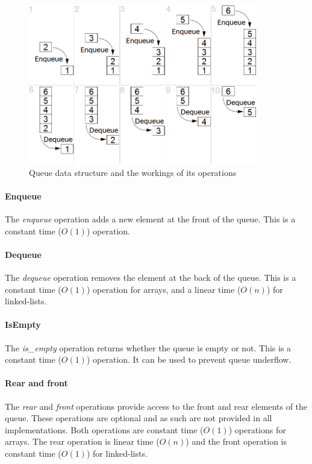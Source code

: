 \documentclass{article}
\begin{document}
\begin{figure}[H]
  \centering
  \includegraphics[width=10cm]{queue}
  \caption{Queue data structure and the workings of its operations}
\end{figure}

\paragraph{Enqueue}
The {\em enqueue} operation adds a new element at the front of the queue.
This is a constant time (\(O(1)\)) operation.

\paragraph{Dequeue}
The {\em dequeue} operation removes the element at the back of the queue.
This is a constant time (\(O(1)\)) operation for arrays, and a linear time (\(O(n)\)) for linked-lists.

\paragraph{IsEmpty}
The {\em is\_empty} operation returns whether the queue is empty or not.
This is a constant time (\(O(1)\)) operation. It can be used to prevent queue underflow.

\paragraph{Rear and front}
The {\em rear} and {\em front} operations provide access to the front and rear elements of the queue.
These operations are optional and as such are not provided in all implementations. Both operations are
constant time (\(O(1)\)) operations for arrays. The rear operation is linear time (\(O(n)\)) and the
front operation is constant time (\(O(1)\)) for linked-lists.
\end{document}
